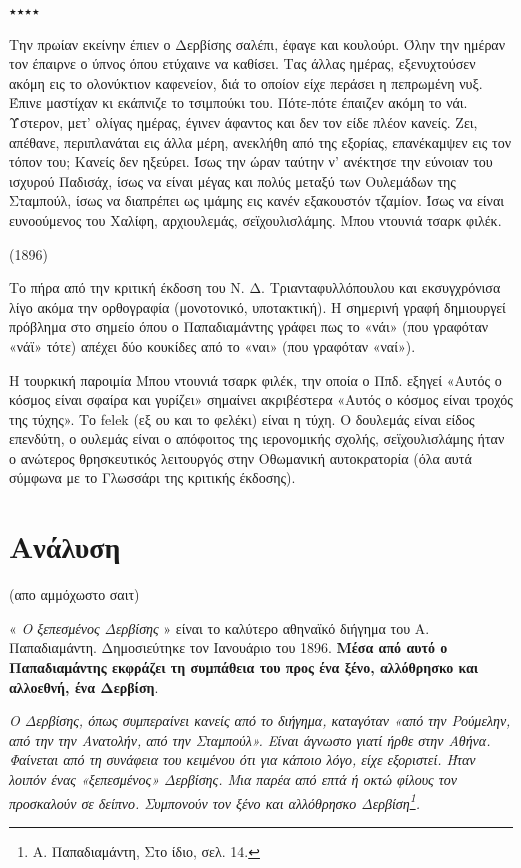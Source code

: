 \documentclass{article}
\begin{document}
٭٭٭٭

Την πρωίαν εκείνην έπιεν ο Δερβίσης σαλέπι, έφαγε και κουλούρι.  Όλην την ημέραν τον έπαιρνε ο ύπνος όπου ετύχαινε να καθίσει.
Τας άλλας ημέρας, εξενυχτούσεν ακόμη εις το ολονύκτιον καφενείον, διά το οποίον είχε περάσει η πεπρωμένη νυξ. Έπινε μαστίχαν κι εκάπνιζε το τσιμπούκι του. Πότε-πότε έπαιζεν ακόμη το νάι.
Ύστερον, μετ’ ολίγας ημέρας, έγινεν άφαντος και δεν τον είδε πλέον κανείς. Ζει, απέθανε, περιπλανάται εις άλλα μέρη, ανεκλήθη από της εξορίας, επανέκαμψεν εις τον τόπον του;
Κανείς δεν ηξεύρει.
Ίσως την ώραν ταύτην ν’ ανέκτησε την εύνοιαν του ισχυρού Παδισάχ, ίσως να είναι μέγας και πολύς μεταξύ των Ουλεμάδων της Σταμπούλ, ίσως να διαπρέπει ως ιμάμης εις κανέν εξακουστόν τζαμίον.
Ίσως να είναι ευνοούμενος του Χαλίφη, αρχιουλεμάς, σεϊχουλισλάμης.
Μπου ντουνιά τσαρκ φιλέκ.

(1896)


Το πήρα από την κριτική έκδοση του Ν. Δ. Τριανταφυλλόπουλου και εκσυγχρόνισα λίγο ακόμα την ορθογραφία (μονοτονικό, υποτακτική). Η σημερινή γραφή δημιουργεί πρόβλημα στο σημείο όπου ο Παπαδιαμάντης γράφει πως το «νάι» (που γραφόταν «νάϊ» τότε) απέχει δύο κουκίδες από το «ναι» (που γραφόταν «ναί»).

Η τουρκική παροιμία Μπου ντουνιά τσαρκ φιλέκ, την οποία ο Ππδ. εξηγεί «Αυτός ο κόσμος είναι σφαίρα και γυρίζει» σημαίνει ακριβέστερα «Αυτός ο κόσμος είναι τροχός της τύχης». Το felek (εξ ου και το φελέκι) είναι η τύχη.
Ο δουλεμάς είναι είδος επενδύτη, ο ουλεμάς είναι ο απόφοιτος της ιερονομικής σχολής, σεϊχουλισλάμης ήταν ο ανώτερος θρησκευτικός λειτουργός στην Οθωμανική αυτοκρατορία (όλα αυτά σύμφωνα με το Γλωσσάρι της κριτικής έκδοσης).

\section{Ανάλυση}
\label{sec-2}
(απο αμμόχωστο σαιτ)

« \emph{Ο ξεπεσμένος Δερβίσης} » είναι το καλύτερο αθηναϊκό διήγημα του Α. Παπαδιαμάντη. Δημοσιεύτηκε τον Ιανουάριο του 1896. \textbf{Μέσα από αυτό ο Παπαδιαμάντης εκφράζει τη συμπάθεια του προς ένα ξένο, αλλόθρησκο και αλλοεθνή, ένα Δερβίση}.

\emph{Ο Δερβίσης, όπως συμπεραίνει κανείς από το διήγημα, καταγόταν «από την Ρούμελην, από την την Ανατολήν, από  την Σταμπούλ»\footnotemark[1]{}.  Είναι άγνωστο γιατί ήρθε στην Αθήνα. Φαίνεται από τη συνάφεια του κειμένου ότι για κάποιο λόγο, είχε εξοριστεί. Ήταν λοιπόν ένας «ξεπεσμένος» Δερβίσης. Μια παρέα από επτά ή οκτώ φίλους τον προσκαλούν σε δείπνο. Συμπονούν τον ξένο και αλλόθρησκο Δερβίση\footnote{Α. Παπαδιαμάντη, Στο ίδιο, σελ. 14.}.}
\end{document}

